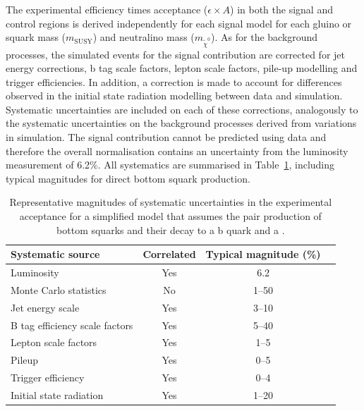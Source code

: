 The experimental efficiency times acceptance ($\epsilon \times A$) in both the signal and 
control regions is derived independently for each signal model for each gluino or squark 
mass ($m_{\text{SUSY}}$) and neutralino mass ($m_{\tilde{\chi}^{0}}$). As for the 
background processes, the simulated events for the signal contribution are corrected for 
jet energy corrections, b tag scale factors, lepton scale factors, pile-up modelling and trigger efficiencies.
In addition, a correction is made to account for differences observed in the initial 
state radiation modelling between data and simulation. Systematic uncertainties are included 
on each of these corrections, analogously to the systematic uncertainties on the background processes derived from
variations in simulation. The signal contribution cannot be predicted using data and therefore the overall normalisation contains an uncertainty
from the luminosity measurement of 6.2\%. All systematics are summarised
in Table~\ref{tab:signal_systs}, including typical magnitudes for direct bottom squark production.

\begin{table}[h!]
  \caption{
    Representative magnitudes of systematic uncertainties in the
    experimental acceptance for a simplified model that assumes the 
    pair production of bottom squarks and their decay to a b
    quark and a \chiz.}  
  \label{tab:signal_systs}
  \centering
  \footnotesize
  \begin{tabular}{ lccc }
    \hline
    Systematic source\T\B          & Correlated & Typical magnitude (\%) \\
    \hline
    Luminosity\T                   & Yes        & 6.2                    \\
    Monte Carlo statistics         & No         & 1--50                  \\
    Jet energy scale               & Yes        & 3--10                  \\
    B tag efficiency scale factors & Yes        & 5--40                  \\
    Lepton scale factors           & Yes        & 1--5                   \\
    Pileup                        & Yes        & 0--5                   \\
    Trigger efficiency             & Yes        & 0--4                   \\
    Initial state radiation        & Yes        & 1--20                  \\
    \hline
  \end{tabular}
\end{table}


